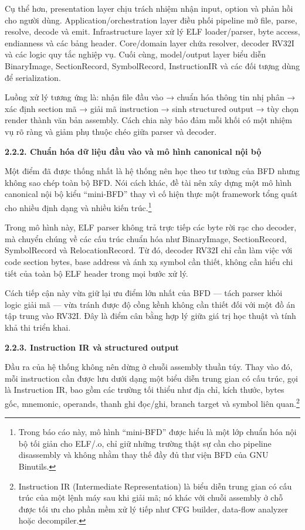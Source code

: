 \documentclass[
]{article}
\begin{document}
Cụ thể hơn, presentation layer chịu trách nhiệm nhận input, option và
phản hồi cho người dùng. Application/orchestration layer điều phối
pipeline mở file, parse, resolve, decode và emit. Infrastructure layer
xử lý ELF loader/parser, byte access, endianness và các bảng header.
Core/domain layer chứa resolver, decoder RV32I và các logic quy tắc
nghiệp vụ. Cuối cùng, model/output layer biểu diễn BinaryImage,
SectionRecord, SymbolRecord, InstructionIR và các đối tượng dùng để
serialization.

Luồng xử lý tương ứng là: nhận file đầu vào → chuẩn hóa thông tin nhị
phân → xác định section mã → giải mã instruction → sinh structured
output → tùy chọn render thành văn bản assembly. Cách chia này bảo đảm
mỗi khối có một nhiệm vụ rõ ràng và giảm phụ thuộc chéo giữa parser và
decoder.

\textbf{2.2.2. Chuẩn hóa dữ liệu đầu vào và mô hình canonical nội bộ}

Một điểm đã được thống nhất là hệ thống nên học theo tư tưởng của BFD
nhưng không sao chép toàn bộ BFD. Nói cách khác, đề tài nên xây dựng một
mô hình canonical nội bộ kiểu ``mini-BFD'' thay vì cố hiện thực một
framework tổng quát cho nhiều định dạng và nhiều kiến trúc.\footnote{Trong
  báo cáo này, mô hình ``mini-BFD'' được hiểu là một lớp chuẩn hóa nội
  bộ tối giản cho ELF/.o, chỉ giữ những trường thật sự cần cho pipeline
  disassembly và không nhằm thay thế đầy đủ thư viện BFD của GNU
  Binutils.}

Trong mô hình này, ELF parser không trả trực tiếp các byte rời rạc cho
decoder, mà chuyển chúng về các cấu trúc chuẩn hóa như BinaryImage,
SectionRecord, SymbolRecord và RelocationRecord. Từ đó, decoder RV32I
chỉ cần làm việc với code section bytes, base address và ánh xạ symbol
cần thiết, không cần hiểu chi tiết của toàn bộ ELF header trong mọi bước
xử lý.

Cách tiếp cận này vừa giữ lại ưu điểm lớn nhất của BFD --- tách parser
khỏi logic giải mã --- vừa tránh được độ cồng kềnh không cần thiết đối
với một đồ án tập trung vào RV32I. Đây là điểm cân bằng hợp lý giữa giá
trị học thuật và tính khả thi triển khai.

\textbf{2.2.3. Instruction IR và structured output}

Đầu ra của hệ thống không nên dừng ở chuỗi assembly thuần túy. Thay vào
đó, mỗi instruction cần được lưu dưới dạng một biểu diễn trung gian có
cấu trúc, gọi là Instruction IR, bao gồm các trường tối thiểu như địa
chỉ, kích thước, bytes gốc, mnemonic, operands, thanh ghi đọc/ghi,
branch target và symbol liên quan.\footnote{Instruction IR (Intermediate
  Representation) là biểu diễn trung gian có cấu trúc của một lệnh máy
  sau khi giải mã; nó khác với chuỗi assembly ở chỗ được tối ưu cho phần
  mềm xử lý tiếp như CFG builder, data-flow analyzer hoặc decompiler.}
\end{document}
